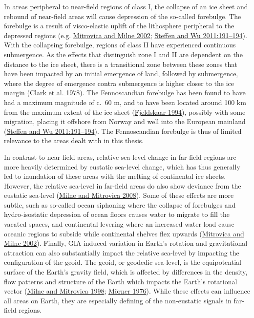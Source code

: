 \documentclass[
  12pt,
  a4paper,
  oneside]{book}
\begin{document}
In areas peripheral to near-field regions of class I, the collapse of an ice sheet and rebound of near-field areas will cause depression of the so-called forebulge. The forebulge is a result of visco-elastic uplift of the lithosphere peripheral to the depressed regions (e.g. \protect\hyperlink{ref-mitrovica2002}{Mitrovica and Milne 2002}; \protect\hyperlink{ref-steffen2011}{Steffen and Wu 2011:191--194}). With the collapsing forebulge, regions of class II have experienced continuous submergence. As the effects that distinguish zone I and II are dependent on the distance to the ice sheet, there is a transitional zone between these zones that have been impacted by an initial emergence of land, followed by submergence, where the degree of emergence contra submergence is higher closer to the ice margin (\protect\hyperlink{ref-clark1978}{Clark et al. 1978}). The Fennoscandian forebulge has been found to have had a maximum magnitude of c.~60 m, and to have been located around 100 km from the maximum extent of the ice sheet (\protect\hyperlink{ref-fjeldskaar1994}{Fjeldskaar 1994}), possibly with some migration, placing it offshore from Norway and well into the European mainland (\protect\hyperlink{ref-steffen2011}{Steffen and Wu 2011:191--194}). The Fennoscandian forebulge is thus of limited relevance to the areas dealt with in this thesis.

In contrast to near-field areas, relative sea-level change in far-field regions are more heavily determined by eustatic sea-level change, which has thus generally led to inundation of these areas with the melting of continental ice sheets. However, the relative sea-level in far-field areas do also show deviance from the eustatic sea-level (\protect\hyperlink{ref-milne2008}{Milne and Mitrovica 2008}). Some of these effects are more subtle, such as so-called ocean siphoning where the collapse of forebulges and hydro-isostatic depression of ocean floors causes water to migrate to fill the vacated spaces, and continental levering where an increased water load cause oceanic regions to subside while continental shelves flex upwards (\protect\hyperlink{ref-mitrovica2002}{Mitrovica and Milne 2002}). Finally, GIA induced variation in Earth's rotation and gravitational attraction can also substantially impact the relative sea-level by impacting the configuration of the geoid. The geoid, or geodedic sea-level, is the equipotential surface of the Earth's gravity field, which is affected by differences in the density, flow patterns and structure of the Earth which impacts the Earth's rotational vector (\protect\hyperlink{ref-milne1998}{Milne and Mitrovica 1998}; \protect\hyperlink{ref-muxf6rner1976}{Mörner 1976}). While these effects can influence all areas on Earth, they are especially defining of the non-eustatic signals in far-field regions.
\end{document}
